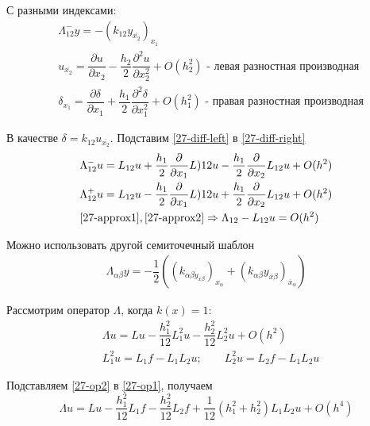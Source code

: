 С разными индексами:
\begin{align}
  &\Lambda_{12}^-y = -(k_{12}y_{\overline{x_2}})_{x_1}\\
  \label{27-diff-left}
  &u_{\overline{x_2}} = \dfrac{\partial u}{\partial x_2} - \dfrac{h_2}{2}
  \dfrac{\partial^2 u}{\partial x_2^2} + O(h_2^2) \text{ - левая разностная
  производная}\\
  \label{27-diff-right}
  &\delta_{x_1} = \dfrac{\partial \delta}{\partial x_1} + \dfrac{h_1}{2}
  \dfrac{\partial^2 \delta}{\partial x_1^2} + O(h_1^2) \text{ - правая разностная
  производная}
\end{align}

В качестве $\delta = k_{12}u_{\overline{x_2}}$. Подставим \eqref{27-diff-left} в
\eqref{27-diff-right}
\begin{align}
  \label{27-approx1}
  &\Lambda_{12}^-u = L_{12}u + \dfrac{h_1}{2}\dfrac{\partial}{\partial x_1}L){12}u
  - \dfrac{h_1}{2}\dfrac{\partial}{\partial x_2}L_{12}u + O(h^2)\\
  \label{27-approx2}
  &\Lambda_{12}^+u = L_{12}u - \dfrac{h_1}{2}\dfrac{\partial}{\partial x_1}L){12}u
  + \dfrac{h_1}{2}\dfrac{\partial}{\partial x_2}L_{12}u + O(h^2)\\
  &\eqref{27-approx1}, \eqref{27-approx2} \Rightarrow \Lambda_{12} - L_{12}u = O(h^2)
\end{align}

\begin{note}
  Можно использовать другой семиточечный шаблон
  \begin{align*}
    \Lambda_{\alpha\beta}y = -\dfrac{1}{2}((k_{\alpha\beta y_{x\beta}})_
    {x_{\alpha}} + (k_{\alpha\beta}y_{\overline{x}\beta})_{\overline{x}_{\alpha}})
  \end{align*}
\end{note}

Рассмотрим оператор $\Lambda$, когда $k(x) = 1$:
\begin{align}
  \label{27-op1}
  &\Lambda u = Lu - \dfrac{h_1^2}{12}L_1^2u - \dfrac{h_2^2}{12}L_2^2u + O(h^2)\\
  \label{27-op2}
  &L_1^2u = L_1f - L_1L_2u;\qquad L_2^2u = L_2f - L_1L_2u
\end{align}

Подставляем \eqref{27-op2} в \eqref{27-op1}, получаем
\begin{equation}
  \Lambda u = Lu - \dfrac{h_1^2}{12}L_1f - \dfrac{h_2^2}{12}L_2f +
  \dfrac{1}{12}(h_1^2 + h_2^2)L_1L_2u + O(h^4)
\end{equation}

